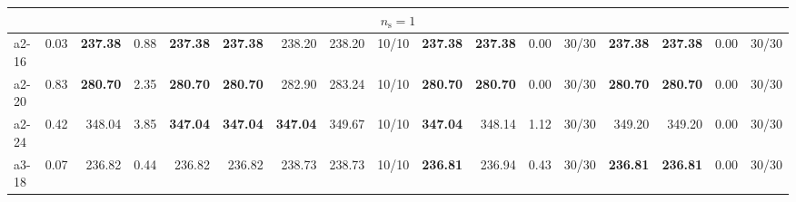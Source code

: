 \documentclass[aspectratio=1610]{beamer}
\begin{document}
\begin{frame}[noframenumbering]
\begin{table}[]
{\begin{tabular}{lrrrrrrrrrrrrrrrr}
\multicolumn{17}{c}{$n_\mathrm{s} = 1$}                                                                                                                                                                                                                                                                                                                                                                                                                                                                                                                                        \\ \hline
a2-16                                          & 0.03                                                    & \multicolumn{1}{r|}{\textbf{237.38}} & 0.88                                                         & \textbf{237.38} & \multicolumn{1}{r|}{{\color[HTML]{FE0000} \textbf{237.38}}} & 238.20          & 238.20                                 & \multicolumn{1}{r|}{10/10} & \textbf{237.38} & {\color[HTML]{FE0000} \textbf{237.38}} & 0.00   & \multicolumn{1}{r|}{30/30} & \textbf{237.38}    & {\color[HTML]{FE0000} \textbf{237.38}}    & 0.00      & 30/30   \\
a2-20                                          & 0.83                                                    & \multicolumn{1}{r|}{\textbf{280.70}} & 2.35                                                         & \textbf{280.70} & \multicolumn{1}{r|}{{\color[HTML]{FE0000} \textbf{280.70}}} & 282.90          & 283.24                                 & \multicolumn{1}{r|}{10/10} & \textbf{280.70} & {\color[HTML]{FE0000} \textbf{280.70}} & 0.00   & \multicolumn{1}{r|}{30/30} & \textbf{280.70}    & {\color[HTML]{FE0000} \textbf{280.70}}    & 0.00      & 30/30   \\
a2-24                                          & 0.42                                                    & \multicolumn{1}{r|}{348.04}          & 3.85                                                         & \textbf{347.04} & \multicolumn{1}{r|}{{\color[HTML]{FE0000} \textbf{347.04}}} & \textbf{347.04} & 349.67                                 & \multicolumn{1}{r|}{10/10} & \textbf{347.04} & 348.14                                 & 1.12   & \multicolumn{1}{r|}{30/30} & 349.20             & 349.20                                    & 0.00      & 30/30   \\
a3-18                                          & 0.07                                                    & \multicolumn{1}{r|}{236.82}          & 0.44                                                         & 236.82          & \multicolumn{1}{r|}{236.82}                                 & 238.73          & 238.73                                 & \multicolumn{1}{r|}{10/10} & \textbf{236.81} & 236.94                                 & 0.43   & \multicolumn{1}{r|}{30/30} & \textbf{236.81}    & {\color[HTML]{FE0000} \textbf{236.81}}    & 0.00      & 30/30   \\

\end{tabular}}
\end{table}
\end{frame}
\end{document}
